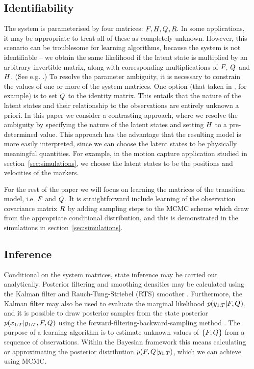 \documentclass[journal,10pt]{IEEEtran}
\begin{document}
\subsection{Identifiability}
The system is parameterised by four matrices: $F_{}, H, Q_{}, R$. In some applications, it may be appropriate to treat all of these as completely unknown. However, this scenario can be troublesome for learning algorithms, because the system is not identifiable -- we obtain the same likelihood if the latent state is multiplied by an arbitrary invertible matrix, along with corresponding multiplications of $F_{}$, $Q_{}$ and $H$. (See e.g. \cite{Roweis1999}.) To resolve the parameter ambiguity, it is necessary to constrain the values of one or more of the system matrices. One option (that taken in \cite{Roweis1999}, for example) is to set $Q_{}$ to the identity matrix. This entails that the nature of the latent states and their relationship to the observations are entirely unknown a priori. In this paper we consider a contrasting approach, where we resolve the ambiguity by specifying the nature of the latent states and setting $H$ to a pre-determined value. This approach has the advantage that the resulting model is more easily interpreted, since we can choose the latent states to be physically meaningful quantities. For example, in the motion capture application studied in section~\ref{sec:simulations}, we choose the latent states to be the positions and velocities of the markers.

For the rest of the paper we will focus on learning the matrices of the transition model, i.e. $F_{}$ and $Q_{}$. It is straightforward include learning of the observation covariance matrix $R$ by adding sampling steps to the MCMC scheme which draw from the appropriate conditional distribution, and this is demonstrated in the simulations in section~\ref{sec:simulations}.

\subsection{Inference}
Conditional on the system matrices, state inference may be carried out analytically. Posterior filtering and smoothing densities may be calculated using the Kalman filter \cite{Kalman1960} and Rauch-Tung-Striebel (RTS) smoother \cite{Rauch1965}. Furthermore, the Kalman filter may also be used to evaluate the marginal likelihood $p(y_{1:T}|F_{}, Q_{})$, and it is possible to draw posterior samples from the state posterior $p(x_{1:T}|y_{1:T}, F_{}, Q_{})$ using the forward-filtering-backward-sampling method \cite{Chib1996}. The purpose of a learning algorithm is to estimate unknown values of $\left\{F_{}, Q_{}\right\}$ from a sequence of observations. Within the Bayesian framework this means calculating or approximating the posterior distribution $p(F_{}, Q_{}|y_{1:T})$, which we can achieve using MCMC. 
\end{document}
